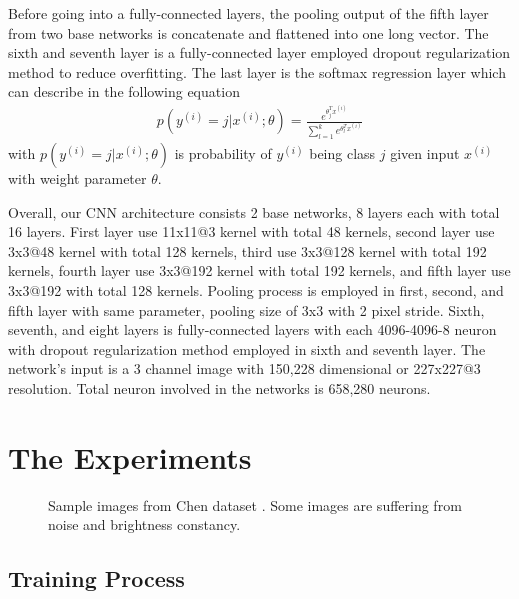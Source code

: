 \documentclass[conference]{IEEEtran}
\begin{document}
Before going into a fully-connected layers, the pooling output of the fifth layer from two base networks is concatenate and flattened into one long vector. The sixth and seventh layer is a fully-connected layer employed dropout regularization method to reduce overfitting. The last layer is the softmax regression layer which can describe in the following equation
\begin{align}
	p(y^{(i)}=j|x^{(i)};\theta)=\frac{e^{\theta^T_jx^{(i)}}}{\sum_{l=1}^ke^{\theta^T_lx^{(i)}}}	
\end{align}
with $p(y^{(i)}=j|x^{(i)};\theta)$ is probability of $y^{(i)}$ being class $j$ given input $x^{(i)}$ with weight parameter $\theta$. 

Overall, our CNN architecture consists 2 base networks, 8 layers each with total 16 layers. First layer use 11x11@3 kernel with total 48 kernels, second layer use 3x3@48 kernel with total 128 kernels, third use 3x3@128 kernel with total 192 kernels, fourth layer use 3x3@192 kernel with total 192 kernels, and fifth layer use 3x3@192 with total 128 kernels. Pooling process is employed in first, second, and fifth layer with same parameter, pooling size of 3x3 with 2 pixel stride. Sixth, seventh, and eight layers is fully-connected layers with each 4096-4096-8 neuron with dropout regularization method employed in sixth and seventh layer. The network's input is a 3 channel image with 150,228 dimensional or 227x227@3 resolution. Total neuron involved in the networks is 658,280 neurons. 

\section{The Experiments}

\begin{figure}
\centering
\caption{Sample images from Chen dataset \cite{pchen}. Some images are suffering from noise and brightness constancy.}
\label{fig:sample_dataset}
\end{figure}

\subsection{Training Process}
\end{document}
